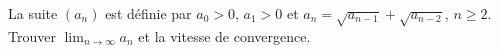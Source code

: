 La suite $(a_n)$ est définie par $a_0 > 0$, $a_1 > 0$ et $a_n = \sqrt{a_{n-1}} + \sqrt{a_{n-2}}$, $n \geq 2$. Trouver $\lim_{n\to\infty} a_n$ et la vitesse de convergence.

